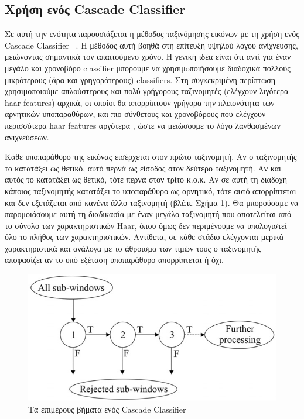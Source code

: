 \subsection{Χρήση ενός Cascade Classifier}

Σε αυτή την ενότητα παρουσιάζεται η μέθοδος ταξινόμησης εικόνων με τη χρήση ενός
Cascade Classifier ~\cite{Viola01rapidobject}. Η μέθοδος αυτή βοηθά στη επίτευξη υψηλού λόγου
ανίχνευσης, μειώνοντας σημαντικά τον απαιτούμενο χρόνο. Η γενική ιδέα είναι ότι αντί για
έναν μεγάλο και χρονοβόρο classifier μπορούμε να χρησιμoποιήσουμε διαδοχικά πολλούς
μικρότερους (άρα και γρηγορότερους) classifiers. Στη συγκεκριμένη περίπτωση χρησιμοποιούμε
απλούστερους και πολύ γρήγορους ταξινομητές (ελέγχουν λιγότερα haar features) αρχικά,
οι οποίοι θα απορρίπτουν γρήγορα την πλειονότητα των αρνητικών υποπαραθύρων,
και πιο σύνθετους και χρονοβόρους που ελέγχουν περισσότερα haar features αργότερα ,
ώστε να μειώσουμε το λόγο λανθασμένων ανιχνεύσεων.

Κάθε υποπαράθυρο της εικόνας εισέρχεται στον πρώτο ταξινομητή. Αν ο ταξινομητής το κατατάξει ως
θετικό, αυτό περνά ως είσοδος στον δεύτερο ταξινομητή. Αν και αυτός το κατατάξει ως θετικό,
τότε περνά στον τρίτο κ.ο.κ. Αν σε αυτή τη διαδοχή κάποιος ταξινομητής κατατάξει το
υποπαράθυρο ως αρνητικό, τότε αυτό απορρίπτεται και δεν εξετάζεται από κανένα άλλο
ταξινομητή (βλέπε Σχήμα \ref{fig:cascadeclassifier}). Θα μπορούσαμε να παρομοιάσουμε
αυτή τη διαδικασία με έναν μεγάλο ταξινομητή που αποτελείται από το σύνολο των χαρακτηριστικών
Haar, όπου όμως δεν περιμένουμε να υπολογιστεί όλο το πλήθος των χαρακτηριστικών.
Αντίθετα, σε κάθε στάδιο ελέγχονται μερικά χαρακτηριστικά και ανάλογα με το άθροισμα
των τιμών τους ο ταξινομητής αποφασίζει αν το υπό εξέταση υποπαράθυρο απορρίπτεται ή όχι.

\begin{figure}[htbp]
  \begin{center}
    \includegraphics[width=0.5\maxwidth]{../figures/cascadeclassifier.png}
    \caption{Τα επιμέρους βήματα ενός Cascade Classifier\label{fig:cascadeclassifier}}
   \end{center}
\end{figure}


